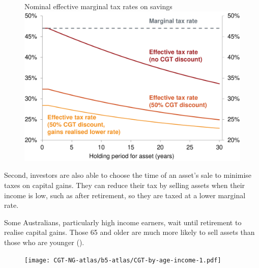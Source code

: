 \begin{figure}
%
{Nominal effective marginal tax rates on savings}\label{fig:CG-marginal-tax-rates-delayed}
\includegraphics[width=\columnwidth]{CGT-NG-atlas/CG-marginal-tax-rates-delayed.pdf}

\end{figure}


Second, investors are also able to choose the time of an asset's sale to minimise taxes on capital gains. They can reduce their tax by selling assets when their income is low, such as after retirement, so they are taxed at a lower marginal rate. 

Some Australians, particularly high income earners, wait until retirement to realise capital gains. Those 65 and older are much more likely to sell assets than those who are younger ().

\begin{figure}
\label{fig:CGT-by-age-income}
\texttt{[image: CGT-NG-atlas/b5-atlas/CGT-by-age-income-1.pdf]}
\end{figure}

